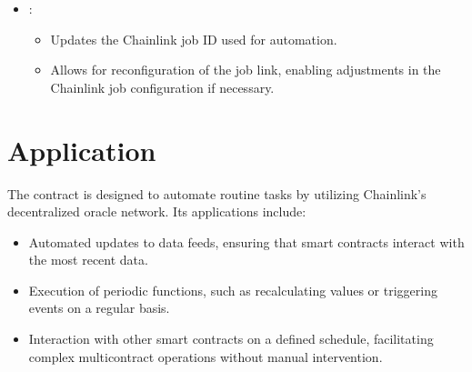 \documentclass[a4paper,10pt,english]{sphinxmanual}
\begin{document}
\begin{itemize}
\item {} 
\sphinxAtStartPar
{}:

\begin{sphinxVerbatim}[commandchars=\\\{\}]
\end{sphinxVerbatim}
\begin{itemize}
\item {} 
\sphinxAtStartPar
{} Updates the Chainlink job ID used for automation.

\item {} 
\sphinxAtStartPar
{} Allows for reconfiguration of the job link, enabling adjustments in the Chainlink job configuration if necessary.

\end{itemize}

\end{itemize}


\section{Application}
\label{\detokenize{docs_chainlink_automation_contract:application}}
\sphinxAtStartPar
The  contract is designed to automate routine tasks by utilizing Chainlink’s decentralized oracle network. Its applications include:
\begin{itemize}
\item {} 
\sphinxAtStartPar
{} Automated updates to data feeds, ensuring that smart contracts interact with the most recent data.

\item {} 
\sphinxAtStartPar
{} Execution of periodic functions, such as recalculating values or triggering events on a regular basis.

\item {} 
\sphinxAtStartPar
{} Interaction with other smart contracts on a defined schedule, facilitating complex multi\sphinxhyphen{}contract operations without manual intervention.

\end{itemize}
\end{document}
